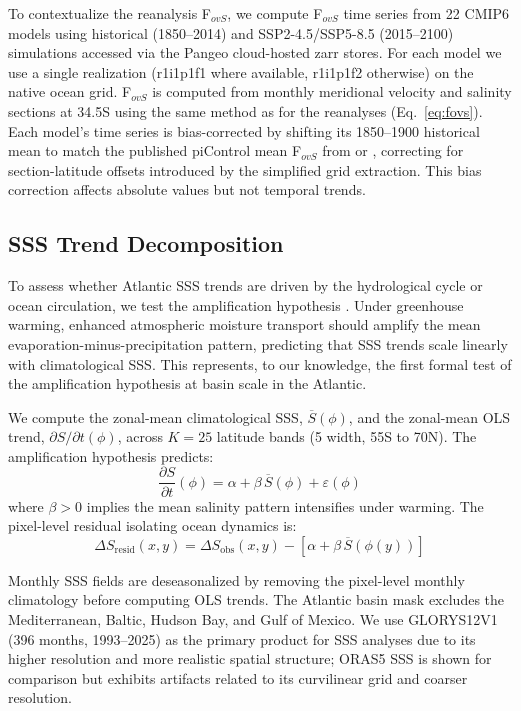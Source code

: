 \documentclass{agujournal2019}
\begin{document}
To contextualize the reanalysis F$_{ovS}$, we compute F$_{ovS}$ time series from 22 CMIP6 models using historical (1850--2014) and SSP2-4.5/SSP5-8.5 (2015--2100) simulations accessed via the Pangeo cloud-hosted zarr stores. For each model we use a single realization (r1i1p1f1 where available, r1i1p1f2 otherwise) on the native ocean grid. F$_{ovS}$ is computed from monthly meridional velocity and salinity sections at 34.5\textdegree S using the same method as for the reanalyses (Eq.~\ref{eq:fovs}). Each model's time series is bias-corrected by shifting its 1850--1900 historical mean to match the published piControl mean F$_{ovS}$ from  or , correcting for section-latitude offsets introduced by the simplified grid extraction. This bias correction affects absolute values but not temporal trends.

\subsection{SSS Trend Decomposition}

To assess whether Atlantic SSS trends are driven by the hydrological cycle or ocean circulation, we test the amplification hypothesis \cite{Held2006,Durack2010}. Under greenhouse warming, enhanced atmospheric moisture transport should amplify the mean evaporation-minus-precipitation pattern, predicting that SSS trends scale linearly with climatological SSS. This represents, to our knowledge, the first formal test of the amplification hypothesis at basin scale in the Atlantic.

We compute the zonal-mean climatological SSS, $\overline{S}(\phi)$, and the zonal-mean OLS trend, $\partial S/\partial t(\phi)$, across $K=25$ latitude bands (5\textdegree{} width, 55\textdegree S to 70\textdegree N). The amplification hypothesis predicts:
\begin{equation}
\frac{\partial S}{\partial t}(\phi) = \alpha + \beta\,\overline{S}(\phi) + \varepsilon(\phi)
\label{eq:amplification}
\end{equation}
where $\beta > 0$ implies the mean salinity pattern intensifies under warming. The pixel-level residual isolating ocean dynamics is:
\begin{equation}
\Delta S_\mathrm{resid}(x,y) = \Delta S_\mathrm{obs}(x,y) - [\alpha + \beta\,\overline{S}(\phi(y))]
\label{eq:residual}
\end{equation}

Monthly SSS fields are deseasonalized by removing the pixel-level monthly climatology before computing OLS trends. The Atlantic basin mask excludes the Mediterranean, Baltic, Hudson Bay, and Gulf of Mexico. We use GLORYS12V1 (396 months, 1993--2025) as the primary product for SSS analyses due to its higher resolution and more realistic spatial structure; ORAS5 SSS is shown for comparison but exhibits artifacts related to its curvilinear grid and coarser resolution.
\end{document}
